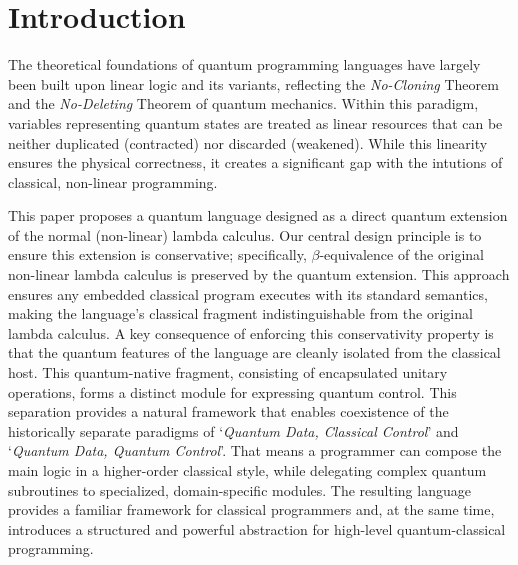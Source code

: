 \section{Introduction} \label{sec:intro}
The theoretical foundations of quantum programming languages have largely been built upon linear logic and its variants\cite{VANTONDER2004_LambdaCalculusQuantum,SELINGER2009_QuantumLambdaCalculus,ALTENKIRCH2005_FunctionalQuantumProgramming,SABRY2018_SymmetricPatternMatchingQuantum,ROSS2017_AlgebraicLogicalMethods}, reflecting the \textit{No-Cloning} Theorem\cite{WOOTTERS1982_SingleQuantumCannota} and the \textit{No-Deleting} Theorem\cite{KUMARPATI2000_ImpossibilityDeletingUnknowna} of quantum mechanics.
Within this paradigm, variables representing quantum states are treated as linear resources that can be neither duplicated (contracted) nor discarded (weakened).
While this linearity ensures the physical correctness, it creates a significant gap with the intutions of classical, non-linear programming.

This paper proposes a quantum language designed as a direct quantum extension of the normal (non-linear) lambda calculus.
Our central design principle is to ensure this extension is conservative; specifically, $\beta$-equivalence of the original non-linear lambda calculus is preserved by the quantum extension.
This approach ensures any embedded classical program executes with its standard semantics, making the language's classical fragment indistinguishable from the original lambda calculus.
A key consequence of enforcing this conservativity property is that the quantum features of the language are cleanly isolated from the classical host.
This quantum-native fragment, consisting of encapsulated unitary operations, forms a distinct module for expressing quantum control.
This separation provides a natural framework that enables coexistence of the historically separate paradigms of `\textit{Quantum Data, Classical Control}'\cite{SELINGER2004_QuantumProgrammingLanguage} and `\textit{Quantum Data, Quantum Control}'\cite{DÍAZ-CARO2022_QuickOverviewQuantum}.
That means a programmer can compose the main logic in a higher-order classical style, while delegating complex quantum subroutines to specialized, domain-specific modules.
The resulting language provides a familiar framework for classical programmers and, at the same time, introduces a structured and powerful abstraction for high-level quantum-classical programming.
